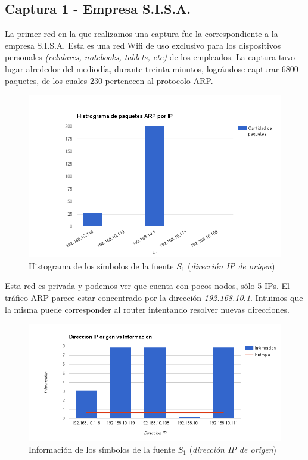 \subsection{Captura 1 - Empresa S.I.S.A.}

La primer red en la que realizamos una captura fue la correspondiente a la empresa S.I.S.A.
Esta es una red Wifi de uso exclusivo para los dispositivos personales \textit{(celulares, notebooks, tablets, etc)} de los empleados.
La captura tuvo lugar alrededor del mediodía, durante treinta minutos, lográndose capturar $6800$ paquetes, de los cuales $230$ pertenecen al protocolo ARP.

\begin{figure}[H]
  \centering
    \includegraphics[width=1.1\textwidth]{imagenes/sisa/histograma.png}
  \caption{Histograma de los símbolos de la fuente $S_1$ (\textit{dirección IP de origen})}
  \label{fig:ejemplo}
\end{figure}

Esta red es privada y podemos ver que cuenta con pocos nodos, sólo 5 IPs. El tráfico ARP parece estar concentrado por la dirección \textit{192.168.10.1}.
Intuimos que la misma puede corresponder al router intentando resolver nuevas direcciones.

\begin{figure}[H]
  \centering
    \includegraphics[width=1.1\textwidth]{imagenes/sisa/ip_informacion.png}
  \caption{Información de los símbolos de la fuente $S_1$ (\textit{dirección IP de origen})}
  \label{fig:ejemplo}
\end{figure}


